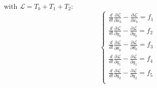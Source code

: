 \documentclass[a4paper,12pt,oneside]{report}
\begin{document}
with $\mathcal{L}=T_b+T_1+T_2$:
\begin{equation}
  \begin{cases}
    \frac{d}{dt}\frac{\partial \mathcal{L} }{\partial \dot{x}_b}-\frac{\partial \mathcal{L}}{\partial x_b}=f_1\\
    \frac{d}{dt}\frac{\partial \mathcal{L} }{\partial \dot{y}_b}-\frac{\partial \mathcal{L}}{\partial y_b}=f_2\\
    \frac{d}{dt}\frac{\partial \mathcal{L} }{\partial \dot{\theta}_0}-\frac{\partial \mathcal{L}}{\partial \theta_0}=f_3\\
    \frac{d}{dt}\frac{\partial \mathcal{L} }{\partial \dot{q}_1}-\frac{\partial \mathcal{L}}{\partial q_1}=f_4\\
    \frac{d}{dt}\frac{\partial \mathcal{L} }{\partial \dot{q}_2}-\frac{\partial \mathcal{L}}{\partial q_2}=f_5\\
  \end{cases}
\end{equation}
\newpage
\end{document}

